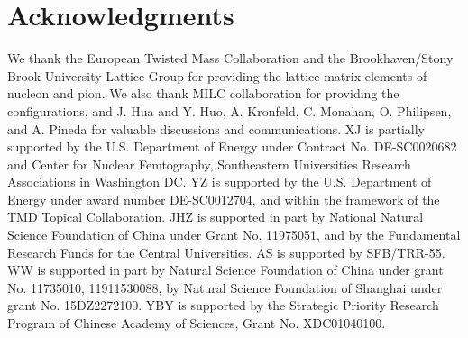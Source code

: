 \section*{Acknowledgments}

We thank the European Twisted Mass Collaboration and the Brookhaven/Stony Brook University Lattice Group for providing the lattice matrix elements of nucleon and pion. We also thank MILC collaboration for providing the configurations, and J. Hua and Y. Huo, A. Kronfeld, C. Monahan, O. Philipsen, and A. Pineda for valuable discussions and communications. XJ is partially supported by the U.S. Department of Energy under Contract No. DE-SC0020682
and Center for Nuclear Femtography, Southeastern Universities Research Associations in Washington DC.
YZ is supported by the U.S. Department of Energy under award number DE-SC0012704, and within the framework of the TMD Topical Collaboration. JHZ is supported in part by National Natural Science Foundation of China under Grant No. 11975051, and by the Fundamental Research Funds for the Central Universities. AS is supported by SFB/TRR-55. WW is supported in part by Natural Science Foundation of China under grant No. 11735010, 11911530088, by Natural Science Foundation of Shanghai under grant No. 15DZ2272100. YBY is supported by the Strategic Priority Research Program of Chinese Academy of Sciences, Grant No. XDC01040100.
